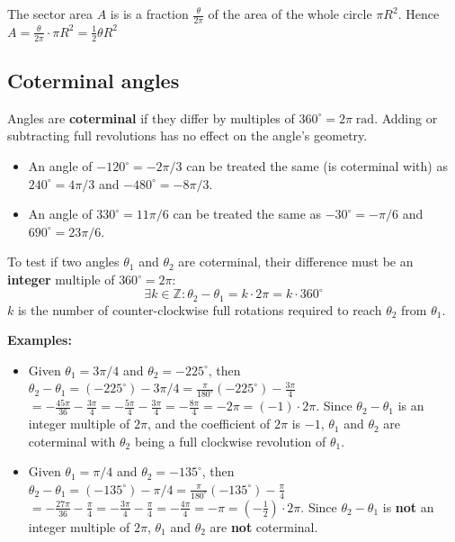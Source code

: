 \documentclass{article}
\begin{document}
 The sector area \(A\) is is a fraction \(\frac{\theta}{2\pi}\) of the area of the whole circle \(\pi R^2\). Hence \(A = \frac{\theta}{2\pi} \cdot \pi R^2 = \frac{1}{2}\theta R^2\)



\subsection{Coterminal angles}

Angles are {\bf coterminal} if they differ by multiples of \(360^\circ = 2\pi\;\text{rad}\). Adding or subtracting full revolutions has no effect on the angle's geometry.

\begin{itemize}
\item An angle of \(-120^\circ = -2\pi/3\) can be treated the same (is coterminal with) as \(240^\circ = 4\pi/3\) and \(-480^\circ = -8\pi/3\). 
\item An angle of \(330^\circ = 11\pi/6\) can be treated the same as \(-30^\circ = -\pi/6\) and \(690^\circ = 23\pi/6\).
\end{itemize}

To test if two angles \(\theta_1\) and \(\theta_2\) are coterminal, their difference must be an {\bf integer} multiple of \(360^\circ = 2\pi\):
\[\exists k \in \mathbb{Z} : \theta_2 - \theta_1 = k \cdot 2\pi = k \cdot 360^\circ\] 
\(k\) is the number of counter-clockwise full rotations required to reach \(\theta_2\) from \(\theta_1\).

\textbf{Examples:}

\begin{itemize}
\item Given \(\theta_1 = 3\pi/4\) and \(\theta_2 = -225^\circ\), then \(\theta_2 - \theta_1 = (-225^\circ) - 3\pi/4 = \frac{\pi}{180^\circ}(-225^\circ) - \frac{3\pi}{4}\) \(= -\frac{45\pi}{36} - \frac{3\pi}{4} = -\frac{5\pi}{4} - \frac{3\pi}{4} = -\frac{8\pi}{4} = -2\pi = (-1) \cdot 2\pi\). Since \(\theta_2 - \theta_1\) is an integer multiple of \(2\pi\), and the coefficient of \(2\pi\) is \(-1\), \(\theta_1\) and \(\theta_2\) are coterminal with \(\theta_2\) being a full clockwise revolution of \(\theta_1\).
\item Given \(\theta_1 = \pi/4\) and \(\theta_2 = -135^\circ\), then \(\theta_2 - \theta_1 = (-135^\circ) - \pi/4 = \frac{\pi}{180^\circ}(-135^\circ) - \frac{\pi}{4}\) \(= - \frac{27\pi}{36} - \frac{\pi}{4} = -\frac{3\pi}{4} - \frac{\pi}{4} = -\frac{4\pi}{4} = -\pi = (-\frac{1}{2}) \cdot 2\pi\). Since \(\theta_2 - \theta_1\) is {\bf not} an integer multiple of \(2\pi\), \(\theta_1\) and \(\theta_2\) are {\bf not} coterminal. 
\end{itemize}
\end{document}
